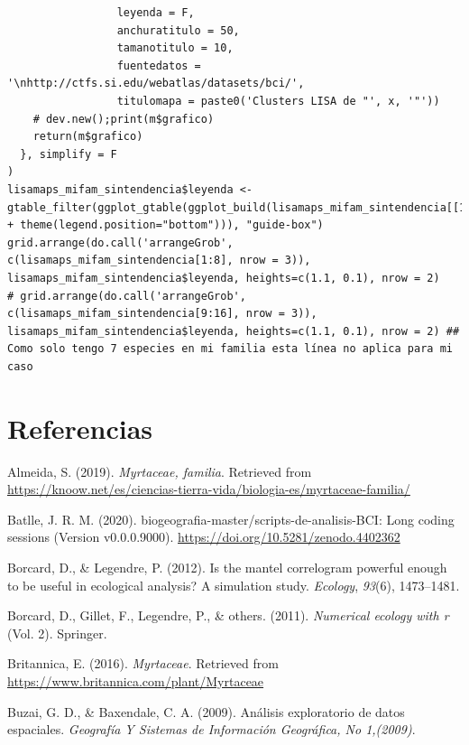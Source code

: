 \documentclass[11pt,]{article}
\begin{document}
\begin{verbatim}
                 leyenda = F,
                 anchuratitulo = 50,
                 tamanotitulo = 10,
                 fuentedatos = '\nhttp://ctfs.si.edu/webatlas/datasets/bci/',
                 titulomapa = paste0('Clusters LISA de "', x, '"'))
    # dev.new();print(m$grafico)
    return(m$grafico)
  }, simplify = F
)
lisamaps_mifam_sintendencia$leyenda <- gtable_filter(ggplot_gtable(ggplot_build(lisamaps_mifam_sintendencia[[1]] + theme(legend.position="bottom"))), "guide-box")
grid.arrange(do.call('arrangeGrob', c(lisamaps_mifam_sintendencia[1:8], nrow = 3)), lisamaps_mifam_sintendencia$leyenda, heights=c(1.1, 0.1), nrow = 2)
# grid.arrange(do.call('arrangeGrob', c(lisamaps_mifam_sintendencia[9:16], nrow = 3)), lisamaps_mifam_sintendencia$leyenda, heights=c(1.1, 0.1), nrow = 2) ## Como solo tengo 7 especies en mi familia esta línea no aplica para mi caso
\end{verbatim}

\section*{Referencias}\label{referencias}

\hypertarget{refs}{}
\hypertarget{ref-sandra2019myrtaceae}{}
Almeida, S. (2019). \emph{Myrtaceae, familia}. Retrieved from
\url{https://knoow.net/es/ciencias-tierra-vida/biologia-es/myrtaceae-familia/}

\hypertarget{ref-jose_ramon_martinez_batlle_2020_4402362}{}
Batlle, J. R. M. (2020). biogeografia-master/scripts-de-analisis-BCI:
Long coding sessions (Version v0.0.0.9000).
\url{https://doi.org/10.5281/zenodo.4402362}

\hypertarget{ref-borcard2012mantel}{}
Borcard, D., \& Legendre, P. (2012). Is the mantel correlogram powerful
enough to be useful in ecological analysis? A simulation study.
\emph{Ecology}, \emph{93}(6), 1473--1481.

\hypertarget{ref-borcard2011numerical}{}
Borcard, D., Gillet, F., Legendre, P., \& others. (2011).
\emph{Numerical ecology with r} (Vol. 2). Springer.

\hypertarget{ref-encymyrtaceae}{}
Britannica, E. (2016). \emph{Myrtaceae}. Retrieved from
\url{https://www.britannica.com/plant/Myrtaceae}

\hypertarget{ref-buzai2009analisis}{}
Buzai, G. D., \& Baxendale, C. A. (2009). Análisis exploratorio de datos
espaciales. \emph{Geografía Y Sistemas de Información Geográfica, No
1,(2009)}.
\end{document}
